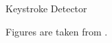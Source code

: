 \documentclass[ucs,9pt]{beamer}
\begin{document}
\begin{frame}{Keystroke Detector}
\begin{minipage}[c]{0.49\linewidth}
		
		
	\end{minipage}	
\centering \tiny
Figures are taken from \cite{b1}.
\end{frame}
\end{document}
